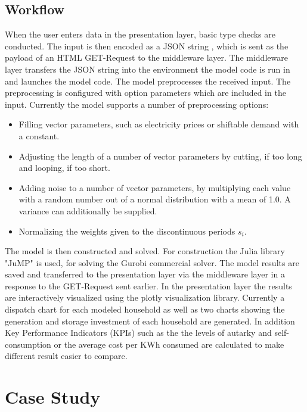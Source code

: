 \documentclass[
	11pt,								%
	DIV10,								%
	a4paper,         					%
	oneside,							%
	headheight=20pt,					%
	footheight=20pt,					%
    parskip=full,						%
    listof=totoc,						%
	bibliography=totoc,					%
	index=totoc,						%
]{scrartcl}
\begin{document}
\subsection{Workflow}
When the user enters data in the presentation layer, basic type checks are conducted. The input is then encoded as a JSON string , which is sent as the payload of an HTML GET-Request  to the middleware layer. The middleware layer transfers the JSON string into the environment the model code is run in and launches the model code. The model preprocesses the received input. The preprocessing is configured with option parameters which are included in the input. Currently the model supports a number of preprocessing options:
\begin{itemize}
	\item Filling vector parameters, such as electricity prices or shiftable demand with a constant. 
	\item Adjusting the length of a number of vector parameters by cutting, if too long and looping, if too short.
	\item Adding noise to a number of vector parameters, by multiplying each value with a random number out of a normal distribution with a mean of 1.0. A variance can additionally be supplied.
	\item Normalizing the weights given to the discontinuous periods $s_i$.
\end{itemize} 
The model is then constructed and solved. For construction the Julia library "JuMP" is used, for solving the Gurobi commercial solver.  The model results are saved and transferred to the presentation layer via the middleware layer in a response to the GET-Request sent earlier. In the presentation layer the results are interactively visualized using the plotly visualization library.  Currently a dispatch chart for each modeled household as well as two charts showing the generation and storage investment of each household are generated. In addition Key Performance Indicators (KPIs) such as the the levels of autarky and self-consumption or the average cost per KWh consumed are calculated to make different result easier to compare.

\newpage
\section{Case Study}
\end{document}
